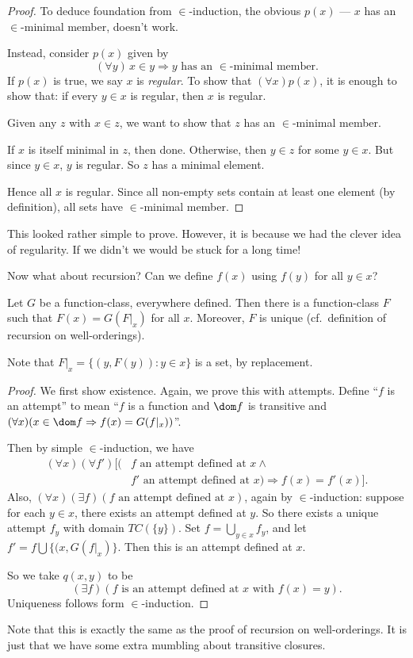 \documentclass[a4paper]{article}
\begin{document}
\begin{proof}
  To deduce foundation from $\in$-induction, the obvious $p(x)$ --- $x$ has an $\in$-minimal member, doesn't work.

  Instead, consider $p(x)$ given by
  \[
    (\forall y)\,x\in y \Rightarrow y\text{ has an }\in\text{-minimal member}.
  \]
  If $p(x)$ is true, we say $x$ is \emph{regular}. To show that $(\forall x)p(x)$, it is enough to show that: if every $y\in x$ is regular, then $x$ is regular.

  Given any $z$ with $x\in z$, we want to show that $z$ has an $\in$-minimal member.

  If $x$ is itself minimal in $z$, then done. Otherwise, then $y\in z$ for some $y\in x$. But since $y\in x$, $y$ is regular. So $z$ has a minimal element.

  Hence all $x$ is regular. Since all non-empty sets contain at least one element (by definition), all sets have $\in$-minimal member.
\end{proof}
This looked rather simple to prove. However, it is because we had the clever idea of regularity. If we didn't we would be stuck for a long time!

Now what about recursion? Can we define $f(x)$ using $f(y)$ for all $y\in x$?

\begin{thm}
  Let $G$ be a function-class, everywhere defined. Then there is a function-class $F$ such that $F(x) = G(F|_x)$ for all $x$. Moreover, $F$ is unique (cf.\ definition of recursion on well-orderings).
\end{thm}
Note that $F|_x = \{(y, F(y)): y\in x\}$ is a set, by replacement.

\begin{proof}
  We first show existence. Again, we prove this with attempts. Define ``$f$ is an attempt'' to mean ``$f$ is a function and $\dom f$ is transitive and $(\forall x)(x\in \dom f \Rightarrow f(x) = G(f|_x))$''.

  Then by simple $\in$-induction, we have
  \begin{align*}
    (\forall x)(\forall f')[(&f\text{ an attempt defined at }x\wedge\\
    & f'\text{ an attempt defined at $x$}) \Rightarrow f(x) = f'(x)].
  \end{align*}
  Also, $(\forall x)(\exists f)(f\text{ an attempt defined at }x)$, again by $\in$-induction: suppose for each $y\in x$, there exists an attempt defined at $y$. So there exists a unique attempt $f_y$ with domain $TC(\{y\})$. Set $f = \bigcup_{y\in x}f_y$, and let $f' = f\bigcup \{(x, G(f|_x)\}$. Then this is an attempt defined at $x$.

  So we take $q(x, y)$ to be
  \[
    (\exists f)(f\text{ is an attempt defined at }x\text{ with }f(x) = y).
  \]
  Uniqueness follows form $\in$-induction.
\end{proof}
Note that this is exactly the same as the proof of recursion on well-orderings. It is just that we have some extra mumbling about transitive closures.
\end{document}
